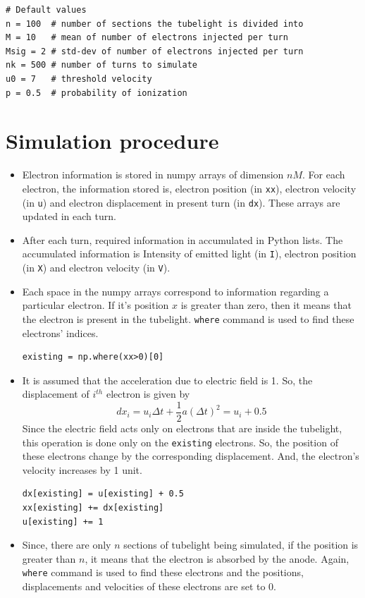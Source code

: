 \documentclass[12pt, a4paper]{article}
\begin{document}
\begin{lstlisting}
# Default values
n = 100  # number of sections the tubelight is divided into
M = 10   # mean of number of electrons injected per turn
Msig = 2 # std-dev of number of electrons injected per turn
nk = 500 # number of turns to simulate
u0 = 7   # threshold velocity
p = 0.5  # probability of ionization
\end{lstlisting}

\section{Simulation procedure}

\begin{itemize}
\item Electron information is stored in numpy arrays of dimension $nM$. For each electron, the information stored is, electron position (in \texttt{xx}), electron velocity (in \texttt{u}) and electron displacement in present turn (in \texttt{dx}). These arrays are updated in each turn.
\item After each turn, required information in accumulated in Python lists. The accumulated information is Intensity of emitted light (in \texttt{I}), electron position (in \texttt{X}) and electron velocity (in \texttt{V}).
\item Each space in the numpy arrays correspond to information regarding a particular electron. If it's position $x$ is greater than zero, then it means that the electron is present in the tubelight. \texttt{where} command is used to find these electrons' indices.
\begin{lstlisting}
existing = np.where(xx>0)[0]
\end{lstlisting}
\item It is assumed that the acceleration due to electric field is 1. So, the displacement of $i^{th}$ electron is given by
\begin{equation*}
dx_i = u_i \Delta t + \frac{1}{2} a (\Delta t)^2 = u_i + 0.5
\end{equation*}
Since the electric field acts only on electrons that are inside the tubelight, this operation is done only on the \texttt{existing} electrons. So, the position of these electrons change by the corresponding displacement. And, the electron's velocity increases by 1 unit.
\begin{lstlisting}
dx[existing] = u[existing] + 0.5
xx[existing] += dx[existing]
u[existing] += 1
\end{lstlisting}
\item Since, there are only $n$ sections of tubelight being simulated, if the position is greater than $n$, it means that the electron is absorbed by the anode. Again, \texttt{where} command is used to find these electrons and the positions, displacements and velocities of these electrons are set to 0.

\end{itemize}
\end{document}
